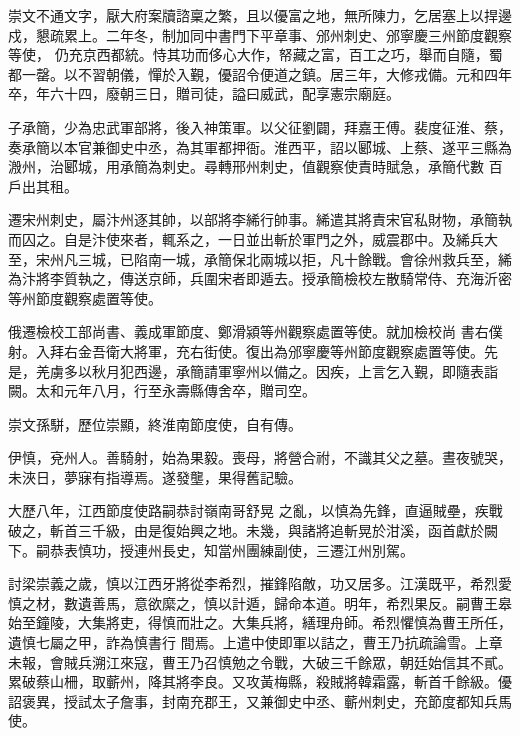 \begin{pinyinscope}
 崇文不通文字，厭大府案牘諮稟之繁，且以優富之地，無所陳力，乞居塞上以捍邊戍，懇疏累上。二年冬，制加同中書門下平章事、邠州刺史、邠寧慶三州節度觀察等使，
 仍充京西都統。恃其功而侈心大作，帑藏之富，百工之巧，舉而自隨，蜀都一罄。以不習朝儀，憚於入覲，優詔令便道之鎮。居三年，大修戎備。元和四年卒，年六十四，廢朝三日，贈司徒，謚曰威武，配享憲宗廟庭。



 子承簡，少為忠武軍部將，後入神策軍。以父征劉闢，拜嘉王傅。裴度征淮、蔡，奏承簡以本官兼御史中丞，為其軍都押衙。淮西平，詔以郾城、上蔡、遂平三縣為溵州，治郾城，用承簡為刺史。尋轉邢州刺史，值觀察使責時賦急，承簡代數
 百戶出其租。



 遷宋州刺史，屬汴州逐其帥，以部將李絺行帥事。絺遣其將責宋官私財物，承簡執而囚之。自是汴使來者，輒系之，一日並出斬於軍門之外，威震郡中。及絺兵大至，宋州凡三城，已陷南一城，承簡保北兩城以拒，凡十餘戰。會徐州救兵至，絺為汴將李質執之，傳送京師，兵圍宋者即遁去。授承簡檢校左散騎常侍、充海沂密等州節度觀察處置等使。



 俄遷檢校工部尚書、義成軍節度、鄭滑潁等州觀察處置等使。就加檢校尚
 書右僕射。入拜右金吾衛大將軍，充右街使。復出為邠寧慶等州節度觀察處置等使。先是，羌虜多以秋月犯西邊，承簡請軍寧州以備之。因疾，上言乞入覲，即隨表詣闕。太和元年八月，行至永壽縣傳舍卒，贈司空。



 崇文孫駢，歷位崇顯，終淮南節度使，自有傳。



 伊慎，兗州人。善騎射，始為果毅。喪母，將營合祔，不識其父之墓。晝夜號哭，未浹日，夢寐有指導焉。遂發壟，果得舊記驗。



 大歷八年，江西節度使路嗣恭討嶺南哥舒晃
 之亂，以慎為先鋒，直逼賊壘，疾戰破之，斬首三千級，由是復始興之地。未幾，與諸將追斬晃於泔溪，函首獻於闕下。嗣恭表慎功，授連州長史，知當州團練副使，三遷江州別駕。



 討梁崇義之歲，慎以江西牙將從李希烈，摧鋒陷敵，功又居多。江漢既平，希烈愛慎之材，數遺善馬，意欲縻之，慎以計遁，歸命本道。明年，希烈果反。嗣曹王皋始至鐘陵，大集將吏，得慎而壯之。大集兵將，繕理舟師。希烈懼慎為曹王所任，遺慎七屬之甲，詐為慎書行
 間焉。上遣中使即軍以詰之，曹王乃抗疏論雪。上章未報，會賊兵溯江來寇，曹王乃召慎勉之令戰，大破三千餘眾，朝廷始信其不貳。累破蔡山柵，取蘄州，降其將李良。又攻黃梅縣，殺賊將韓霜露，斬首千餘級。優詔褒異，授試太子詹事，封南充郡王，又兼御史中丞、蘄州刺史，充節度都知兵馬使。




\end{pinyinscope}
